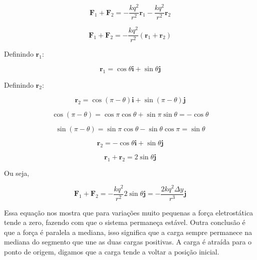 \documentclass[a4paper, 12pt]{article}
\begin{document}
	
	\[
	\textbf{F}_1+\textbf{F}_2=-\frac{kq^2}{r^2}\textbf{r}_1-\frac{kq^2}{r^2}\textbf{r}_2
	\]
	
	\[
	\textbf{F}_1+\textbf{F}_2=-\frac{kq^2}{r^2}\left(\textbf{r}_1+\textbf{r}_2\right)
	\]
	
	Definindo $\textbf{r}_1$:
	
	\[
	\textbf{r}_1=\cos\theta \textbf{i}+\sin\theta \textbf{j}
	\]
	
	Definindo $\textbf{r}_2$:
	
	\[
	\textbf{r}_2=\cos{\left(\pi-\theta\right)} \textbf{i}+\sin{\left(\pi-\theta\right)} \textbf{j}
	\]
	
	\[
	\cos{\left(\pi-\theta\right)}=\cos\pi\cos\theta+\sin\pi\sin\theta=-\cos\theta
	\]
	
	\[
	\sin\left(\pi-\theta\right)=\sin\pi\cos\theta-\sin\theta\cos\pi=\sin\theta
	\]
	
	\[
	\textbf{r}_2=-\cos\theta \textbf{i}+\sin\theta \textbf{j}
	\]
	
	
	\begin{equation}
		\textbf{r}_1+\textbf{r}_2=2\sin\theta\textbf{j}
	\end{equation}
	
	Ou seja,
	
	\[
	\textbf{F}_1+\textbf{F}_2=-\frac{kq^2}{r^2}2\sin\theta\textbf{j}=-\frac{2kq^2\Delta y}{r^3}\textbf{j}
	\]
	
	Essa equação nos mostra que para variações muito pequenas a força eletrostática tende a zero, fazendo com que o sistema permaneça estável. Outra conclusão é que a força é paralela a mediana, isso significa que a carga sempre permanece na mediana do segmento que une as duas cargas positivas. A carga é atraída para o ponto de origem, digamos que a carga tende a voltar a posição inicial. 
	
\end{document}
